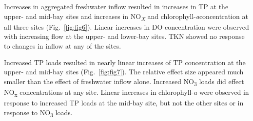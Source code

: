 \documentclass[fleqn,10pt,lineno]{wlpeerj} %
\begin{document}
Increases in aggregated freshwater inflow resulted in increases in TP at
the upper- and mid-bay sites and increases in NO\textsubscript{\emph{X}}
and chlorophyll-\emph{a}concentration at all three sites
(Fig.~\ref{fig:fig6}). Linear increases in DO concentration were
observed with increasing flow at the upper- and lower-bay sites. TKN
showed no response to changes in inflow at any of the sites.

Increased TP loads resulted in nearly linear increases of TP
concentration at the upper- and mid-bay sites (Fig.~\ref{fig:fig7}). The
relative effect size appeared much smaller than the effect of freshwater
inflow alone. Increased NO\textsubscript{3} loads did effect
NO\textsubscript{x} concentrations at any site. Linear increases in
chlorophyll-\emph{a} were observed in response to increased TP loads at
the mid-bay site, but not the other sites or in response to
NO\textsubscript{3} loads.
\end{document}
